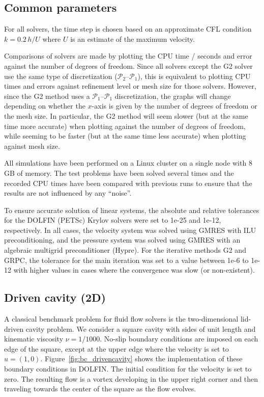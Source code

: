 \subsection{Common parameters}

For all solvers, the time step is chosen based on an approximate CFL
condition $k = 0.2 \, h / U$ where $U$ is an estimate of the maximum
velocity.

Comparisons of solvers are made by plotting the CPU time / seconds and
error against the number of degrees of freedom. Since all solvers
except the G2 solver use the same type of discretization
($\mathcal{P}_2$--$\mathcal{P}_1$), this is equivalent to plotting CPU times and errors
against refinement level or mesh size for those solvers. However,
since the G2 method uses a $\mathcal{P}_1$--$\mathcal{P}_1$ discretization, the graphs
will change depending on whether the $x$-axis is given by the number
of degrees of freedom or the mesh size. In particular, the G2 method
will seem slower (but at the same time more accurate) when plotting
against the number of degrees of freedom, while seeming to be faster
(but at the same time less accurate) when plotting against mesh size.

All simulations have been performed on a Linux cluster on a single
node with 8 GB of memory. The test problems have been solved several
times and the recorded CPU times have been compared with previous runs
to ensure that the results are not influenced by any ``noise''.

To ensure accurate solution of linear systems, the absolute and
relative tolerances for the DOLFIN (PETSc) Krylov solvers were set to
1e-25 and 1e-12, respectively. In all cases, the velocity system was
solved using GMRES with ILU preconditioning, and the pressure system
was solved using GMRES with an algebraic multigrid preconditioner
(Hypre). For the iterative methods G2 and GRPC, the tolerance for the
main iteration was set to a value between 1e-6 to 1e-12 with higher
values in cases where the convergence was slow (or non-existent).

\subsection{Driven cavity (2D)}

A classical benchmark problem for fluid flow solvers is the
two-dimensional lid-driven cavity problem. We consider a square cavity
with sides of unit length and kinematic viscosity $\nu =
1/1000$. No-slip boundary conditions are imposed on each edge of the
square, except at the upper edge where the velocity is set to $u = (1,
0)$. Figure~\ref{fig:bc_drivencavity} shows the implementation of
these boundary conditions in DOLFIN. The initial condition for the
velocity is set to zero. The resulting flow is a vortex developing in
the upper right corner and then traveling towards the center of the
square as the flow evolves.

